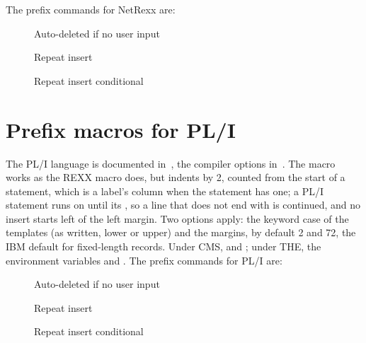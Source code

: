 \documentclass[11pt]{article}
\begin{document}
The prefix commands for NetRexx are:

\begin{description}
\item[{}] Auto-deleted if no user input

\item[{}] Repeat insert
\item[{}] Repeat insert conditional
\end{description}

\section*{Prefix macros for PL/I}

The PL/I language is documented in~\cite{pliref}, the compiler options in~\cite{pliguide}. The macro  works as the REXX macro does, but indents by 2, counted from the start of a statement, which is a label's column when the statement has one; a PL/I statement runs on until its \constant{;}, so a line that does not end with \constant{;} is continued, and no insert starts left of the left margin. Two options apply: the keyword case of the templates (as written, lower or upper) and the margins, by default 2 and 72, the IBM default for fixed-length records. Under CMS,  and ; under THE, the environment variables  and .
The prefix commands for PL/I are:

\begin{description}
\item[{}] Auto-deleted if no user input

\item[{}] Repeat insert
\item[{}] Repeat insert conditional
\end{description}



\end{document}
